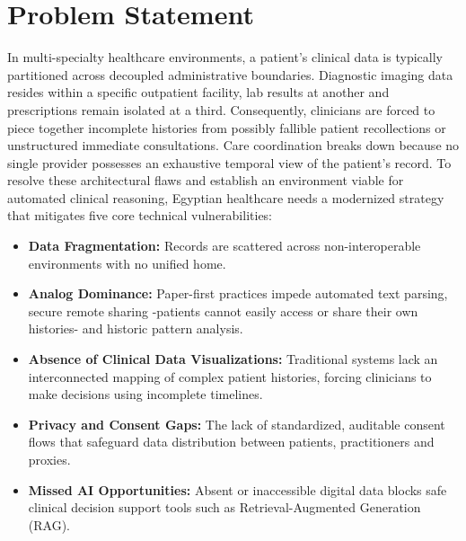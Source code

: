 \section{Problem Statement}\label{sec:problem_statement}
In multi-specialty healthcare environments, a patient's clinical data is typically partitioned across decoupled administrative boundaries. 
Diagnostic imaging data resides within a specific outpatient facility, lab results at
another and prescriptions remain isolated at a third. 
Consequently, clinicians are forced to piece together incomplete
histories from possibly fallible patient recollections or unstructured immediate consultations. 
Care coordination breaks down because no single provider possesses an exhaustive temporal view of the patient's record.
To resolve these architectural flaws and establish an environment viable for automated clinical reasoning,
Egyptian healthcare needs a modernized strategy that mitigates five core technical vulnerabilities:
\begin{itemize}
      \item \textbf{Data Fragmentation:} Records are scattered across non-interoperable environments with no unified home.
      \item \textbf{Analog Dominance:} Paper-first practices impede automated text parsing, 
      secure remote sharing -patients cannot easily access or share their own histories- and historic pattern analysis. %
      \item \textbf{Absence of Clinical Data Visualizations:} Traditional systems lack an interconnected mapping of complex patient histories, 
      forcing clinicians to make decisions using incomplete timelines.
      \item \textbf{Privacy and Consent Gaps:} The lack of standardized, auditable consent flows that safeguard data distribution between patients, practitioners and proxies.
      \item \textbf{Missed AI Opportunities:} Absent or inaccessible digital data blocks safe clinical decision support tools
      such as Retrieval-Augmented Generation (RAG).
\end{itemize}

